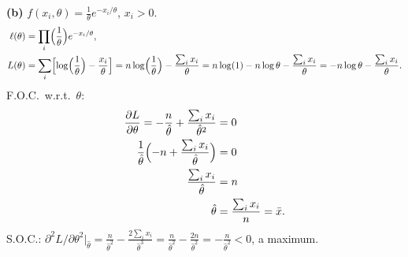 \documentclass[11pt]{article}
\begin{document}
\textbf{(b)} $f(x_i,\theta)=\frac1\theta e^{-x_i/\theta}$, $x_i>0$.
\begin{align*}
  \ell(\theta)&=\prod_i\Bigl(\frac1\theta\Bigr)e^{-x_i/\theta},\\
  L(\theta)&=\sum_i\Bigl[\log\Bigl(\frac1\theta\Bigr)-\frac{x_i}{\theta}\Bigr]
  =n\log\Bigl(\frac1\theta\Bigr)-\frac{\sum_i x_i}{\theta}
  =n\log(1)-n\log\theta-\frac{\sum_i x_i}{\theta}
  =-n\log\theta-\frac{\sum_i x_i}{\theta}.
\end{align*}
F.O.C.\ w.r.t.\ $\theta$:
\begin{align*}
  \frac{\partial L}{\partial\theta}=-\frac{n}{\hat\theta}+\frac{\sum_i x_i}{\hat\theta^2}&=0\\
  \frac1{\hat\theta}\Bigl(-n+\frac{\sum_i x_i}{\hat\theta}\Bigr)&=0\\
  \frac{\sum_i x_i}{\hat\theta}&=n\\
  \hat\theta&=\frac{\sum_i x_i}{n}=\bar x .
\end{align*}
S.O.C.: $\partial^2L/\partial\theta^2\big|_{\hat\theta}=\frac{n}{\hat\theta^2}-\frac{2\sum_ix_i}{\hat\theta^3}=\frac{n}{\hat\theta^2}-\frac{2n}{\hat\theta^2}=-\frac{n}{\hat\theta^2}<0$, a maximum.
\end{document}
